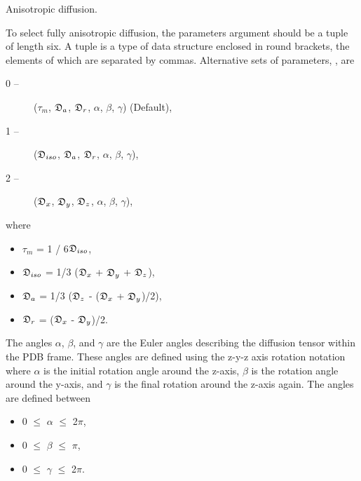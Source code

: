 Anisotropic  diffusion.

To select fully anisotropic  diffusion, the parameters argument should be a tuple of length
six.  A tuple is a type of data structure enclosed in round brackets, the elements of which
are separated by commas.  Alternative sets of parameters, 
, are

\begin{description}
\item[    0 --]   ($\tau_m$, $\mathfrak{D}_a$, $\mathfrak{D}_r$, $\alpha$, $\beta$, $\gamma$)   (Default),
\item[    1 --]   ($\mathfrak{D}_{iso}$, $\mathfrak{D}_a$, $\mathfrak{D}_r$, $\alpha$, $\beta$, $\gamma$),
\item[    2 --]   ($\mathfrak{D}_x$, $\mathfrak{D}_y$, $\mathfrak{D}_z$, $\alpha$, $\beta$, $\gamma$),
\end{description}

where

\begin{itemize}
\item[]     $\tau_m$ = 1 / 6$\mathfrak{D}_{iso}$,
\item[]     $\mathfrak{D}_{iso}$ = 1/3 ($\mathfrak{D}_x$ + $\mathfrak{D}_y$ + $\mathfrak{D}_z$),
\item[]     $\mathfrak{D}_a$ = 1/3 ($\mathfrak{D}_z$ - ($\mathfrak{D}_x$ + $\mathfrak{D}_y$)/2),
\item[]     $\mathfrak{D}_r$ = ($\mathfrak{D}_x$ - $\mathfrak{D}_y$)/2.
\end{itemize}

The angles  $\alpha$, $\beta$, and $\gamma$ are the Euler angles   describing the diffusion tensor 
within the PDB  frame.  These angles  are defined using the z-y-z axis rotation  notation where
$\alpha$ is the initial rotation  angle  around the z-axis, $\beta$ is the rotation  angle  around the
y-axis, and $\gamma$ is the final rotation  around the z-axis again.  The angles  are defined
between

\begin{itemize}
\item[]     0 $\le$ $\alpha$ $\le$ 2$\pi$,
\item[]     0 $\le$ $\beta$ $\le$ $\pi$,
\item[]     0 $\le$ $\gamma$ $\le$ 2$\pi$.
\end{itemize}

